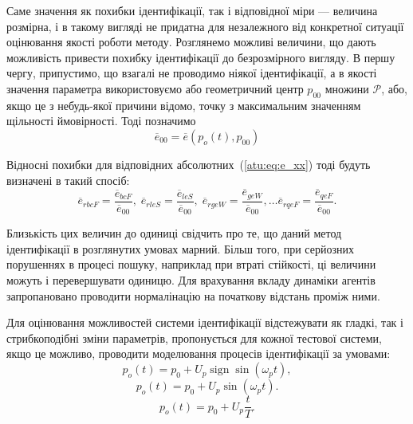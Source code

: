 \documentclass[a4paper,13pt]{atuaref}
\DeclareMathOperator*{\sign}{sign}
\begin{document}
Саме значення як похибки ідентифікації, так і відповідної міри ---
величина розмірна, і в такому вигляді не придатна для незалежного від
конкретної ситуації оцінювання якості роботи методу. Розглянемо можливі
величини, що дають можливість привести похибку ідентифікації до безрозмірного
вигляду. В першу чергу, припустимо, що взагалі не проводимо ніякої
ідентифікації, а в якості значення параметра використовуємо або геометричний
центр $p_{00}$ множини $\mathcal{P}$, або, якщо це з небудь-якої причини
відомо, точку з максимальним значенням щільності ймовірності. Тоді позначимо
%
\begin{equation}
  \overline{e}_{00}
  =
  \overline{e}(p_o(t),p_{00})
  \label{atu:eq:e_00}
\end{equation}

Відносні похибки для відповідних абсолютних~(\ref{atu:eq:e_xx})
тоді будуть визначені в такий спосіб:
%
\begin{equation}
  \overline{e}_{rbcF} = \frac{\overline{e}_{bcF}}{\overline{e}_{00}}, \;
  \overline{e}_{rleS} = \frac{\overline{e}_{leS}}{\overline{e}_{00}}, \;
  \overline{e}_{rgeW} = \frac{\overline{e}_{geW}}{\overline{e}_{00}},
  \ldots
  \overline{e}_{rqeF} = \frac{\overline{e}_{qeF}}{\overline{e}_{00}}.
  \label{atu:eq:e_rxx}
\end{equation}

Близькість цих величин до одиниці свідчить про те, що даний метод ідентифікації
в розглянутих умовах марний. Більш того, при серйозних порушеннях в процесі
пошуку, наприклад при втраті стійкості, ці величини можуть і перевершувати
одиницю.
Для врахування вкладу динаміки агентів запропановано проводити нормалінацію
на початкову відстань проміж ними.


Для оцінювання можливостей системи ідентифікації відстежувати як гладкі, так і
стрибкоподібні зміни параметрів, пропонується для кожної тестової системи, якщо
це можливо, проводити моделювання процесів ідентифікації за умовами:
%
\begin{equation}
  p_o(t) = p_0 +  U_{p} \sign \sin( \omega_{p} t ),
  \label{atu:eq:po_t_sign}
\end{equation}
%
%
\begin{equation}
  p_o(t) = p_0 +  U_{p} \sin( \omega_{p} t ).
  \label{atu:eq:po_t_sin}
\end{equation}
%
\begin{equation}
  p_o(t) = p_0 +  U_{p} \frac{t}{T}.
  \label{atu:eq:po_t_ramp}
\end{equation}
\end{document}
